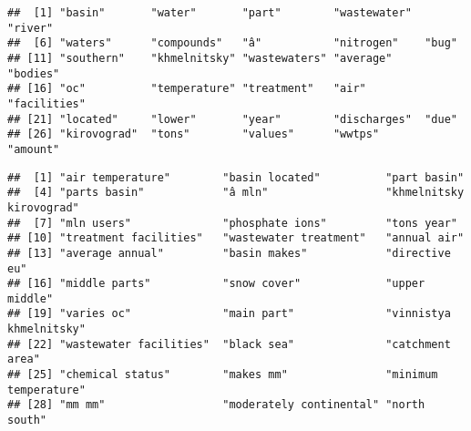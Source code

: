 \documentclass[
]{article}
\newenvironment{Shaded}{\begin{snugshade}}{\end{snugshade}}
\newcommand{\DecValTok}[1]{\textcolor[rgb]{0.00,0.00,0.81}{#1}}
\newcommand{\FunctionTok}[1]{\textcolor[rgb]{0.00,0.00,0.00}{#1}}
\newcommand{\NormalTok}[1]{#1}
\newcommand{\SpecialCharTok}[1]{\textcolor[rgb]{0.00,0.00,0.00}{#1}}
\begin{document}
\begin{Shaded}
\end{Shaded}

\begin{verbatim}
##  [1] "basin"       "water"       "part"        "wastewater"  "river"      
##  [6] "waters"      "compounds"   "â"           "nitrogen"    "bug"        
## [11] "southern"    "khmelnitsky" "wastewaters" "average"     "bodies"     
## [16] "oc"          "temperature" "treatment"   "air"         "facilities" 
## [21] "located"     "lower"       "year"        "discharges"  "due"        
## [26] "kirovograd"  "tons"        "values"      "wwtps"       "amount"
\end{verbatim}

\begin{Shaded}
\end{Shaded}

\begin{verbatim}
##  [1] "air temperature"        "basin located"          "part basin"            
##  [4] "parts basin"            "â mln"                  "khmelnitsky kirovograd"
##  [7] "mln users"              "phosphate ions"         "tons year"             
## [10] "treatment facilities"   "wastewater treatment"   "annual air"            
## [13] "average annual"         "basin makes"            "directive eu"          
## [16] "middle parts"           "snow cover"             "upper middle"          
## [19] "varies oc"              "main part"              "vinnistya khmelnitsky" 
## [22] "wastewater facilities"  "black sea"              "catchment area"        
## [25] "chemical status"        "makes mm"               "minimum temperature"   
## [28] "mm mm"                  "moderately continental" "north south"
\end{verbatim}
\end{document}
